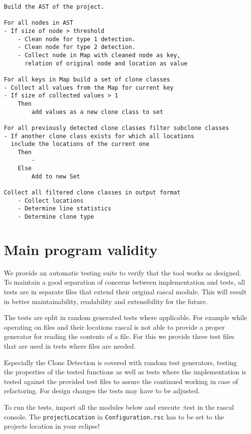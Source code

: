 \documentclass{uva-inf-article}
\begin{document}
\begin{lstlisting}[style=pseudocodeStyle,caption={General algorithm preudocode},captionpos=b]
Build the AST of the project.

For all nodes in AST 
- If size of node > threshold
	- Clean node for type 1 detection.
	- Clean node for type 2 detection.
	- Collect node in Map with cleaned node as key, 
  	  relation of original node and location as value

For all keys in Map build a set of clone classes
- Collect all values from the Map for current key
- If size of collected values > 1 
	Then 
		add values as a new clone class to set

For all previously detected clone classes filter subclone classes
- If another clone class exists for which all locations 
  include the locations of the current one 
 	Then
		-
	Else
		Add to new Set

Collect all filtered clone classes in output format
	- Collect locations
	- Determine line statistics
	- Determine clone type

\end{lstlisting}

\section{Main program validity}

We provide an automatic testing suite to verify that the tool works as designed. To maintain a good separation of concerns between implementation and tests, all tests are in separate files that extend their original rascal module. This will result in better maintainability, readability and extensibility for the future. 

The tests are split in random generated tests where applicable. For example while operating on files and their locations rascal is not able to provide a proper generator for reading the contents of a file. For this we provide three test files that are used in tests where files are needed. 

Especially the Clone Detection is covered with random test generators, testing the properties of the tested functions as well as tests where the implementation is tested against the provided test files to assure the continued working in case of refactoring. For design changes the tests may have to be adjusted.

To run the tests, import all the modules below and execute :test in the rascal console. The \texttt{projectLocation} in \texttt{Configuration.rsc} has to be set to the projects location in your eclipse!
\end{document}
